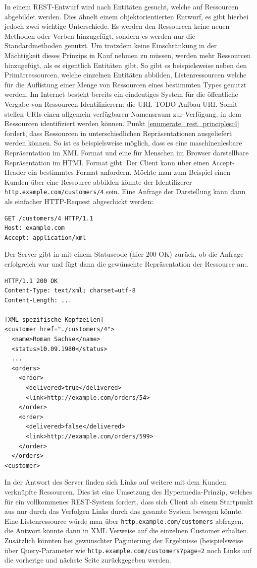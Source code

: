 In einem REST-Entwurf wird nach Entitäten gesucht, welche auf Ressourcen abgebildet werden. Dies ähnelt einem objektorientierten Entwurf, es gibt hierbei jedoch zwei wichtige Unterschiede. Es werden den Ressourcen keine neuen Methoden oder Verben hinzugefügt, sondern es werden nur die Standardmethoden genutzt. Um trotzdem keine Einschränkung in der Mächtigkeit dieses Prinzips in Kauf nehmen zu müssen, werden mehr Ressourcen hinzugefügt, als es eigentlich Entitäten gibt. So gibt es beispielsweise neben den Primärressourcen, welche einzelnen Entitäten abbilden, Listenressourcen welche für die Auflistung einer Menge von Ressourcen eines bestimmten Types genutzt werden. Im Internet besteht bereits ein eindeutiges System für die öffentliche Vergabe von Ressourcen-Identifizierern: die URI. TODO Aufbau URI. Somit stellen URIs einen allgemein verfügbaren Namensraum zur Verfügung, in dem Ressourcen identifiziert werden können. Punkt \ref{enumerate_rest_principles:4} fordert, dass Ressourcen in unterschiedlichen Repräsentationen ausgeliefert werden können. So ist es beispielsweise möglich, dass es eine maschinenlesbare Repräsentation im XML Format und eine für Menschen im Browser darstellbare Repräsentation im HTML Format gibt. Der Client kann über einen Accept-Header ein bestimmtes Format anfordern. 
Möchte man zum Beispiel einen Kunden über eine Ressource abbilden könnte der Identifizerer \texttt{http.example.com/customers/4} sein. Eine Anfrage der Darstellung kann dann als einfacher HTTP-Request abgeschickt werden:
\begin{lstlisting}
GET /customers/4 HTTP/1.1
Host: example.com
Accept: application/xml 
\end{lstlisting}

Der Server gibt in mit einem Statuscode (hier 200 OK) zurück, ob die Anfrage erfolgreich war und fügt dann die gewünschte Repräsentation der Ressource an:.

\begin{lstlisting}
HTTP/1.1 200 OK
Content-Type: text/xml; charset=utf-8
Content-Length: ...

[XML spezifische Kopfzeilen]
<customer href="./customers/4">
  <name>Roman Sachse</name>
  <status>10.09.1980</status>
  ...
  <orders>
    <order>
      <delivered>true</delivered>
      <link>http://example.com/orders/54>
    </order>
    <order>
      <delivered>false</delivered>
      <link>http://example.com/orders/599>
    </order>
  </orders>
<customer>
\end{lstlisting}

In der Antwort des Server finden sich Links auf weitere mit dem Kunden verknüpfte Ressourcen. Dies ist eine Umsetzung des Hypermedia-Prinzip, welches für ein vollkommenes REST-System fordert, dass sich Client ab einem Startpunkt aus nur durch das Verfolgen Links durch das gesamte System bewegen könnte. Eine Listenressource würde man über \texttt{http.example.com/customers} abfragen, die Antwort könnte dann in XML Verweise auf die einzelnen Customer erhalten. Zusätzlich könnten bei gewünschter Paginierung der Ergebnisse (beispielsweise über Query-Parameter wie \texttt{http.example.com/customers?page=2} noch Links auf die vorherige und nächste Seite zurückgegeben werden.

